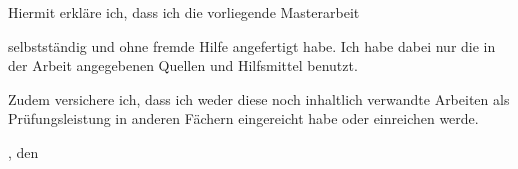 Hiermit erkläre ich, dass ich die vorliegende Masterarbeit
\begin{quote}
\textbf{\titel}   
\end{quote}

selbstständig und ohne fremde Hilfe angefertigt habe. 
Ich habe dabei nur die in der Arbeit angegebenen Quellen und Hilfsmittel benutzt.

Zudem versichere ich, dass ich weder diese noch inhaltlich verwandte Arbeiten als Prüfungsleistung in anderen Fächern eingereicht habe oder einreichen werde.

\vspace{3em}
\ort, den \datumAbgabe \hfill \autor 

